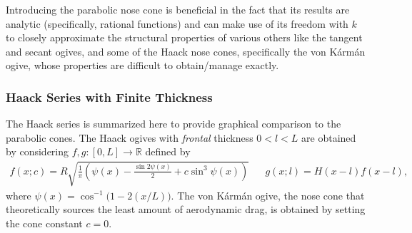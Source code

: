 \documentclass[11pt,dvipsnames]{thesis}
\begin{document}
Introducing the parabolic nose cone is beneficial in the fact that its results are analytic (specifically, rational functions) and can make use of its freedom with $k$ to closely approximate the structural properties of various others like the tangent and secant ogives, and some of the Haack nose cones, specifically the von K\'{a}rm\'{a}n ogive, whose properties are difficult to obtain/manage exactly.

\subsubsection{Haack Series with Finite Thickness}
The Haack series is summarized here to provide graphical comparison to the parabolic cones. The Haack ogives with \textit{frontal} thickness $0 < l < L$ are obtained by considering $f,g : [0,L] \to \mathbb{R}$ defined by
\begin{align}
f(x; c) = R \sqrt{\frac{1}{\pi}\left(\psi(x) - \frac{\sin 2\psi(x)}{2} + c \sin^3 \psi(x)\right)} && g(x; l) = H(x - l) f(x - l),
\end{align}
where $\psi(x) = \cos^{-1}\big(1 - 2(x/L)\big)$.
The von K\'{a}rm\'{a}n ogive, the nose cone that theoretically sources the least amount of aerodynamic drag, is obtained by setting the cone constant $c = 0$.
\end{document}
